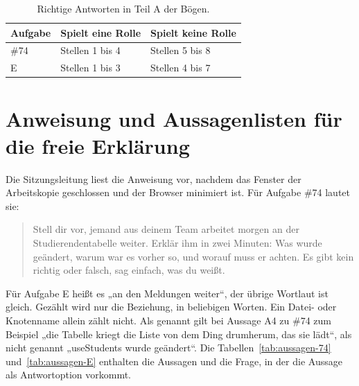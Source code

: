 \begin{table}[htbp]
  \centering
  \caption{Richtige Antworten in Teil A der Bögen.}
  \label{tab:schluessel-a}
  \small
  \begin{tabular}{lll}
    \toprule
    Aufgabe & Spielt eine Rolle & Spielt keine Rolle \\
    \midrule
    \#74 & Stellen 1 bis 4 & Stellen 5 bis 8 \\
    E & Stellen 1 bis 3 & Stellen 4 bis 7 \\
    \bottomrule
  \end{tabular}
\end{table}

\section{Anweisung und Aussagenlisten für die freie Erklärung}
\label{app:aussagen}

Die Sitzungsleitung liest die Anweisung vor, nachdem das Fenster der Arbeitskopie geschlossen und der Browser minimiert ist. Für Aufgabe \#74 lautet sie:

\begin{quote}
Stell dir vor, jemand aus deinem Team arbeitet morgen an der Studierendentabelle weiter. Erklär ihm in zwei Minuten: Was wurde geändert, warum war es vorher so, und worauf muss er achten. Es gibt kein richtig oder falsch, sag einfach, was du weißt.
\end{quote}

Für Aufgabe E heißt es „an den Meldungen weiter“, der übrige Wortlaut ist gleich. Gezählt wird nur die Beziehung, in beliebigen Worten. Ein Datei- oder Knotenname allein zählt nicht. Als genannt gilt bei Aussage A4 zu \#74 zum Beispiel „die Tabelle kriegt die Liste von dem Ding drumherum, das sie lädt“, als nicht genannt „useStudents wurde geändert“. Die Tabellen~\ref{tab:aussagen-74} und~\ref{tab:aussagen-E} enthalten die Aussagen und die Frage, in der die Aussage als Antwortoption vorkommt.

